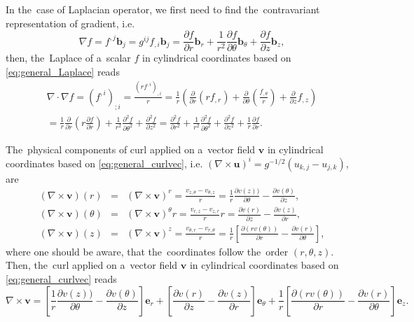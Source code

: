 \documentclass[review]{elsarticle}
\newcommand{\pdv}[2]{\frac{\partial{#1}}{\partial{#2}}}
\newcommand{\vect}[1]{\boldsymbol{#1}}
\begin{document}
In the~case of Laplacian operator, we first need to find the~contravariant 
representation of gradient, i.e.
\begin{equation}
  \nabla f = f^{,j}\vect{b}_j = g^{ij} f_{,i}\vect{b}_j 
  = \pdv{f}{r}\vect{b}_r 
  + \frac{1}{r^2}\pdv{f}{\theta}\vect{b}_{\theta}
  + \pdv{f}{z}\vect{b}_z ,
  \nonumber
\end{equation}
then, the~Laplace of a~scalar $f$ in cylindrical coordinates based on
\eqref{eq:general_Laplace} reads
\begin{multline}
  \nabla\cdot\nabla f = (f^{,i})_{;i} = 
  \frac{(r f^{,i})_{,i}}{r} 
  = \frac{1}{r}\left( \pdv{}{r}\left(r f_{,r} \right) 
  + \pdv{}{\theta}\left(\frac{f_{,\theta}}{r}\right)
  + \pdv{}{z} f_{,z} \right) \\
  = \frac{1}{r}\pdv{}{r}\left(r\pdv{f}{r} \right) 
  + \frac{1}{r^2} \frac{\partial^2 f}{\partial\theta^2}
  + \frac{\partial^2 f}{\partial z^2}
  =  \frac{\partial^2 f}{\partial r^2}
  + \frac{1}{r^2} \frac{\partial^2 f}{\partial\theta^2}
  + \frac{\partial^2 f}{\partial z^2} + \frac{1}{r}\pdv{f}{r} .
  \label{eq:cyl_Laplacef}
\end{multline}

The~physical components of curl applied on a~vector field $\vect{v}$ 
in cylindrical coordinates based on \eqref{eq:general_curlvec}, 
i.e. $(\nabla\times\vect{u})^i = g^{-1/2} (u_{k,j} - u_{j,k})$, are
\begin{eqnarray}
  (\nabla\times\vect{v})(r) &=& (\nabla\times\vect{v})^r 
  = \frac{v_{z, \theta} - v_{\theta, z}}{r} 
  = \frac{1}{r} \pdv{v(z))}{\theta} - \pdv{v(\theta)}{z} , 
  \nonumber \\
  (\nabla\times\vect{v})(\theta) &=& (\nabla\times\vect{v})^\theta r 
  = \frac{v_{r,z} - v_{z,r}}{r} r  
  = \pdv{v(r)}{z} - \pdv{v(z)}{r} , 
  \nonumber \\
  (\nabla\times\vect{v})(z) &=& (\nabla\times\vect{v})^z 
  = \frac{v_{\theta,r} - v_{r, \theta}}{r} 
  = \frac{1}{r}
  \left[\pdv{(r v(\theta))}{r} 
  - \pdv{v(r)}{\theta} \right] , \nonumber
\end{eqnarray}
where one should be aware, that the~coordinates follow the~order 
$(r, \theta, z)$.
Then, the~curl applied on a~vector field $\vect{v}$ in cylindrical coordinates 
based on \eqref{eq:general_curlvec} reads
\begin{equation}
  \nabla\times\vect{v} = 
  \left[ \frac{1}{r} \pdv{v(z))}{\theta} - \pdv{v(\theta)}{z} \right] 
  \vect{e}_r
  + \left[ \pdv{v(r)}{z} - \pdv{v(z)}{r} \right] \vect{e}_\theta
  + \frac{1}{r} \left[\pdv{(r v(\theta))}{r} - \pdv{v(r)}{\theta} \right] 
  \vect{e}_z .
  \label{eq:cyl_curlvec}
\end{equation}
\end{document}
